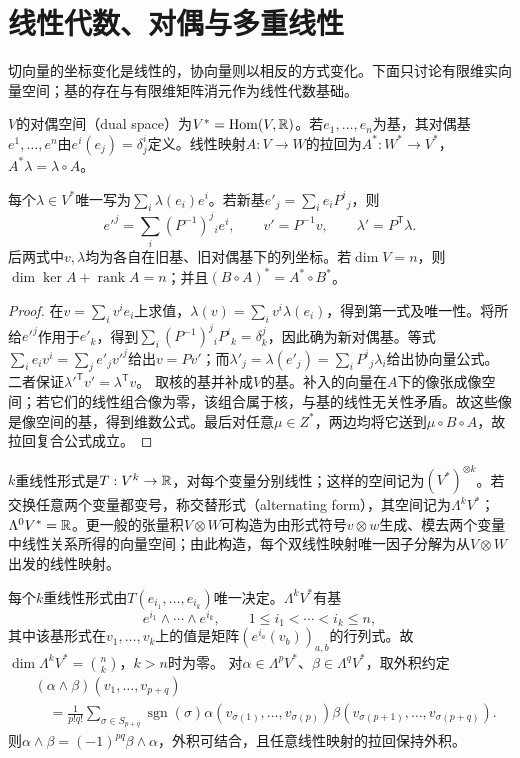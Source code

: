 \section{线性代数、对偶与多重线性}
切向量的坐标变化是线性的，协向量则以相反的方式变化。下面只讨论有限维实向量空间；基的存在与有限维矩阵消元作为线性代数基础。
\begin{definition}[对偶与拉回]
$V$的对偶空间（dual space）为$V^*=\operatorname{Hom}(V,\mathbb{R})$。若$e_1,\ldots,e_n$为基，其对偶基$e^1,\ldots,e^n$由$e^i(e_j)=\delta^i_j$定义。线性映射$A:V\to W$的拉回为$A^*:W^*\to V^*$，$A^*\lambda=\lambda\circ A$。
\end{definition}
\begin{theorem}[对偶、换基与秩]\label{thm:dual-basis}
每个$\lambda\in V^*$唯一写为$\sum_i\lambda(e_i)e^i$。若新基$e'_j=\sum_i e_iP^i{}_j$，则
\[
 e'^j=\sum_i(P^{-1})^j{}_i e^i,\qquad
 v'=P^{-1}v,\qquad \lambda'=P^{\mathsf T}\lambda.
\]
后两式中$v,\lambda$均为各自在旧基、旧对偶基下的列坐标。若$\dim V=n$，则$\dim\ker A+\operatorname{rank}A=n$；并且$(B\circ A)^*=A^*\circ B^*$。
\end{theorem}
\begin{proof}
在$v=\sum_i v^ie_i$上求值，$\lambda(v)=\sum_i v^i\lambda(e_i)$，得到第一式及唯一性。将所给$e'^j$作用于$e'_k$，得到$\sum_i(P^{-1})^j{}_iP^i{}_k=\delta^j_k$，因此确为新对偶基。等式$\sum_i e_iv^i=\sum_j e'_jv'^j$给出$v=Pv'$；而$\lambda'_j=\lambda(e'_j)=\sum_iP^i{}_j\lambda_i$给出协向量公式。二者保证$\lambda'^{\mathsf T}v'=\lambda^{\mathsf T}v$。
取核的基并补成$V$的基。补入的向量在$A$下的像张成像空间；若它们的线性组合像为零，该组合属于核，与基的线性无关性矛盾。故这些像是像空间的基，得到维数公式。最后对任意$\mu\in Z^*$，两边均将它送到$\mu\circ B\circ A$，故拉回复合公式成立。
\end{proof}
\begin{definition}
$k$重线性形式是$T:V^k\to\mathbb{R}$，对每个变量分别线性；这样的空间记为$(V^*)^{\otimes k}$。若交换任意两个变量都变号，称交替形式（alternating form），其空间记为$\Lambda^kV^*$；$\Lambda^0V^*=\mathbb{R}$。更一般的张量积$V\otimes W$可构造为由形式符号$v\otimes w$生成、模去两个变量中线性关系所得的向量空间；由此构造，每个双线性映射唯一因子分解为从$V\otimes W$出发的线性映射。
\end{definition}
\begin{theorem}[分量展开与外积]\label{thm:alternating}
每个$k$重线性形式由$T(e_{i_1},\ldots,e_{i_k})$唯一决定。$\Lambda^kV^*$有基
\[
 e^{i_1}\wedge\cdots\wedge e^{i_k},\qquad 1\leq i_1<\cdots<i_k\leq n,
\]
其中该基形式在$v_1,\ldots,v_k$上的值是矩阵$(e^{i_a}(v_b))_{a,b}$的行列式。故$\dim\Lambda^kV^*=\binom nk$，$k>n$时为零。
对$\alpha\in\Lambda^pV^*$、$\beta\in\Lambda^qV^*$，取外积约定
\begin{align*}
 &(\alpha\wedge\beta)(v_1,\ldots,v_{p+q})\\
 &\quad=\frac1{p!q!}\sum_{\sigma\in S_{p+q}}\operatorname{sgn}(\sigma)
 \alpha(v_{\sigma(1)},\ldots,v_{\sigma(p)})
 \beta(v_{\sigma(p+1)},\ldots,v_{\sigma(p+q)}).
\end{align*}
则$\alpha\wedge\beta=(-1)^{pq}\beta\wedge\alpha$，外积可结合，且任意线性映射的拉回保持外积。
\end{theorem}
